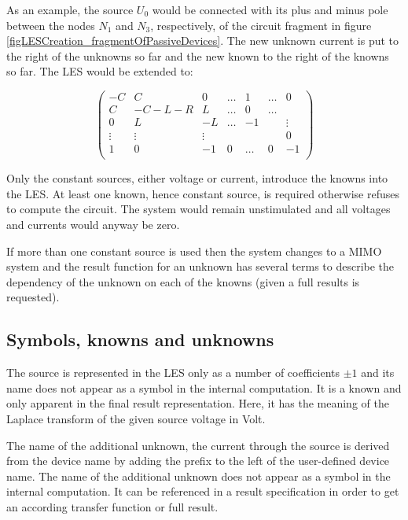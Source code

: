 As an example, the source $U_0$ would be connected with its plus and minus
pole between the nodes $N_1$ and $N_3$, respectively, of the circuit
fragment in figure \ref{figLESCreation_fragmentOfPassiveDevices}. The new
unknown current  is put to the right of the unknowns so far
and the new known to the right of the knowns so far. The LES would be
extended to:

\begin{displaymath}
\left(
\begin{array}{ccccccc}
-C      & C      &  0     & \ldots & 1      & \ldots & 0       \\
 C      & -C-L-R &  L     & \ldots & 0      & \ldots &         \\
 0      &    L   & -L     & \ldots & -1     &        & \vdots  \\
 \vdots & \vdots & \vdots &        &        &        & 0       \\
 1      &    0   & -1     & 0      & \ldots & 0      & -1      \\
\end{array}
\right)
\end{displaymath}

Only the constant sources, either voltage or current, introduce the knowns
into the LES. At least one known, hence constant source, is required
otherwise \linnet{} refuses to compute the circuit. The system would
remain unstimulated and all voltages and currents would anyway be zero.

If more than one constant source is used then the system changes to a MIMO
system and the result function for an unknown has several terms to
describe the dependency of the unknown on each of the knowns (given a full
results is requested).


\subsection{Symbols, knowns and unknowns}

The source is represented in the LES only as a number of coefficients $\pm
1$ and its name does not appear as a symbol in the internal computation.
It is a known and only apparent in the final result representation. Here,
it has the meaning of the Laplace transform of the given source voltage in
Volt.

The name of the additional unknown, the current through the source is
derived from the device name by adding the prefix  to the left
of the user-defined device name. The name of the additional unknown does
not appear as a symbol in the internal computation. It can be referenced
in a result specification in order to get an according transfer function
or full result.



